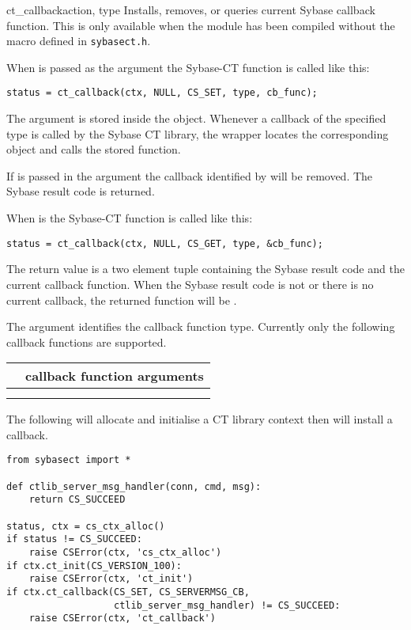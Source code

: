 \begin{methoddesc}[CS_CONTEXT]{ct_callback}{action, type }
Installs, removes, or queries current Sybase callback function.  This
is only available when the  module has been compiled
without the  macro defined in \texttt{sybasect.h}.

When  is passed as the  argument the
Sybase-CT  function is called like this:

\begin{verbatim}
status = ct_callback(ctx, NULL, CS_SET, type, cb_func);
\end{verbatim}

The  argument is stored inside the 
object.  Whenever a callback of the specified type is called by the
Sybase CT library, the  wrapper locates the
corresponding  object and calls the stored function.

If  is passed in the  argument the callback
identified by  will be removed.  The Sybase result code is
returned.

When  is  the Sybase-CT
 function is called like this:

\begin{verbatim}
status = ct_callback(ctx, NULL, CS_GET, type, &cb_func);
\end{verbatim}

The return value is a two element tuple containing the Sybase result
code and the current callback function.  When the Sybase result code
is not  or there is no current callback, the returned
function will be .

The  argument identifies the callback function type.
Currently only the following callback functions are supported.

\begin{longtable}{l|l}
\var{type} & callback function arguments \\
\hline
\code{CS_CLIENTMSG_CB} & \code{ctx, conn, msg} \\
\code{CS_SERVERMSG_CB} & \code{ctx, conn, msg} \\
\end{longtable}

The following will allocate and initialise a CT library context then
will install a callback.

\begin{verbatim}
from sybasect import *

def ctlib_server_msg_handler(conn, cmd, msg):
    return CS_SUCCEED

status, ctx = cs_ctx_alloc()
if status != CS_SUCCEED:
    raise CSError(ctx, 'cs_ctx_alloc')
if ctx.ct_init(CS_VERSION_100):
    raise CSError(ctx, 'ct_init')
if ctx.ct_callback(CS_SET, CS_SERVERMSG_CB,
                   ctlib_server_msg_handler) != CS_SUCCEED:
    raise CSError(ctx, 'ct_callback')
\end{verbatim}
\end{methoddesc}

